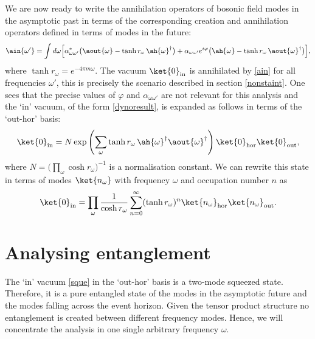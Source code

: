 We are now ready to write the annihilation operators of bosonic field
modes in the  asymptotic past   in terms of the corresponding creation
and annihilation operators defined in terms of modes in the future:
\begin{equation}\label{ain}
\ain{\omega'}=\int d\omega \Big[\alpha^*_{\omega\omega'}
\big(\aout{\omega}-\tanh r_{\omega}\,\ah{\omega}^\dagger\big)+\alpha_{\omega\omega'}e^{i\varphi}\big(\ah{\omega}-\tanh r_{\omega}\,
\aout{\omega}^\dagger\big)\Big],
\end{equation}
where  $\tanh r_{\omega} = e^{-4\pi m\omega}$. The vacuum $\ket{0}_\text{in}$ is annihilated by \eqref{ain} for all
frequencies $\omega'$, this is precisely the scenario described in section \eqref{nonstaint}. One sees that the precise
values of $\varphi$ and  $\alpha_{\omega\omega'}$ are not relevant for this analysis and the `in' vacuum, of the form \eqref{dynoresult}, is expanded as follows in terms of the `out-hor' basis:
\begin{equation}
\ket{0}_\text{in}=N \exp\left(\sum_{\omega}\tanh r_{\omega}\,
\ah{\omega}^\dagger \aout{\omega}^\dagger\right)
\ket{0}_{\text{hor}}\ket{0}_{\text{out}},
\end{equation}
where $N=\big(\prod_{\omega}\cosh r_{\omega}\big)^{-1}$ is a
normalisation constant. We can rewrite this state in terms of modes
$\ket{n_{\omega}}$ with frequency $\omega$ and occupation number
$n$ as
\begin{equation}\label{sque}
\ket{0}_\text{in}=\prod_{\omega}\frac{1}{\cosh r_{\omega}}
\sum_{n=0}^\infty (\tanh r_{\omega})^{n}\ket{n_{\omega}}_\text{hor}
\ket{n_{\omega}}_{\text{out}}.
\end{equation}

\section{Analysing entanglement}

The `in' vacuum \eqref{sque} in the `out-hor' basis is a two-mode squeezed state.  Therefore, it is a pure  entangled
state of the modes   in the asymptotic future and the modes falling
across  the event horizon. Given the tensor product structure no
entanglement is created between different frequency modes. Hence, we
will concentrate the analysis in one single arbitrary frequency $\omega$.


